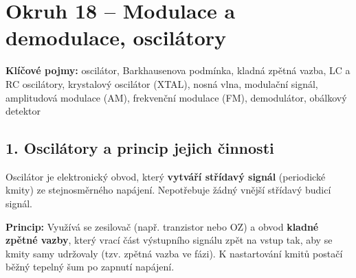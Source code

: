 \documentclass[a4paper,10pt]{article}
\begin{document}
\section*{\large Okruh 18 – Modulace a demodulace, oscilátory}

\begin{pojmybox}
\textbf{Klíčové pojmy:}
oscilátor, Barkhausenova podmínka, kladná zpětná vazba, LC a RC oscilátory, krystalový oscilátor (XTAL), nosná vlna, modulační signál, amplitudová modulace (AM), frekvenční modulace (FM), demodulátor, obálkový detektor
\end{pojmybox}

\begin{vysvetlenibox}

\subsection*{1. Oscilátory a princip jejich činnosti}

Oscilátor je elektronický obvod, který \textbf{vytváří střídavý signál} (periodické kmity) ze stejnosměrného napájení. Nepotřebuje žádný vnější střídavý budicí signál.

\textbf{Princip:} Využívá se zesilovač (např. tranzistor nebo OZ) a obvod \textbf{kladné zpětné vazby}, který vrací část výstupního signálu zpět na vstup tak, aby se kmity samy udržovaly (tzv. zpětná vazba ve fázi). K nastartování kmitů postačí běžný tepelný šum po zapnutí napájení.

\begin{center}
\end{center}
\end{vysvetlenibox}
\end{document}
